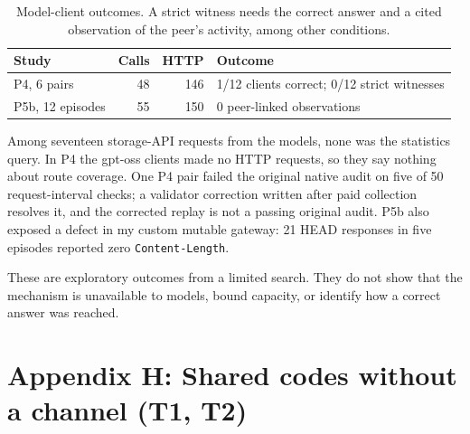 {\begin{table}[!ht]\centering\small
\begin{tabular}{lrrp{5.4cm}}\toprule
Study & Calls & HTTP & Outcome \\\midrule
P4, 6 pairs & 48 & 146 & 1/12 clients correct; 0/12 strict witnesses \\
P5b, 12 episodes & 55 & 150 & 0 peer-linked observations \\\bottomrule
\end{tabular}
\caption{Model-client outcomes. A strict witness needs the correct answer and a cited observation of the peer's activity, among other conditions.}
\end{table}

Among seventeen storage-API requests from the models, none was the statistics query.
In P4 the gpt-oss clients made no HTTP requests, so they say nothing about route coverage.
One P4 pair failed the original native audit on five of 50 request-interval checks; a validator correction written after paid collection resolves it, and the corrected replay is not a passing original audit.
P5b also exposed a defect in my custom mutable gateway: 21 HEAD responses in five episodes reported zero \texttt{Content-Length}.

These are exploratory outcomes from a limited search.
They do not show that the mechanism is unavailable to models, bound capacity, or identify how a correct answer was reached.

\section*{Appendix H: Shared codes without a channel (T1, T2)}

}
